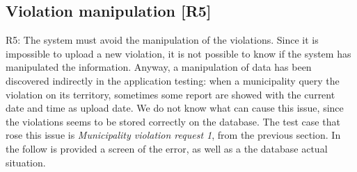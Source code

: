 \documentclass[../ATD.tex]{subfiles}
\begin{document}
    \subsection{Violation manipulation [R5]}\label{subsec:violation-manipulation}
    R5: The system must avoid the manipulation of the violations.
    \newline
    Since it is impossible to upload a new violation, it is not possible to know if the system has manipulated the information.
    Anyway, a manipulation of data has been discovered indirectly in the application testing: when a municipality query the violation on its territory, sometimes some report are showed with the current date and time as upload date.
    We do not know what can cause this issue, since the violations seems to be stored correctly on the database.
    The test case that rose this issue is \textit{Municipality violation request 1}, from the previous section.
    In the follow is provided a screen of the error, as well as a the database actual situation.
\end{document}
